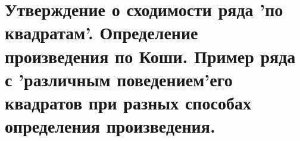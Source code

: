 \documentclass[../main.tex]{subfiles}
\begin{document}
\newpage
\section{Утверждение о сходимости ряда 'по квадратам'. Определение произведения по Коши. Пример ряда с 'различным поведением'его квадратов при разных способах определения произведения.}
\end{document}
